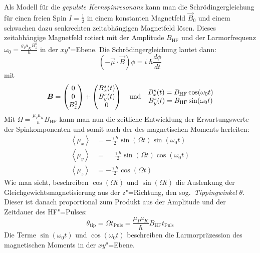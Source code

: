 Als Modell für die \emph{gepulste Kernspinresonanz} kann man die Schrödingergleichung für
einen freien Spin $I=\frac12$ in einem konstanten Magnetfeld $\vec B_0$ und einem schwachen dazu
senkrechten zeitabhängigen Magnetfeld lösen.
Dieses zeitabhängige Magnetfeld rotiert mit der Amplitude $B_\mathrm{HF}$ und der Larmorfrequenz
$\omega_0=\frac{g_I\mu_KB_z^0}{\hbar}$ in der $xy$"=Ebene. Die Schrödingergleichung lautet dann:
	\begin{equation}
		\left(-\vec\mu\cdot{\vec B}\right) \phi = i\;\hbar \frac{d\phi}{dt}
	\end{equation}
mit
	\[
			\bm B= \begin{pmatrix}0\\0\\B_z^0\end{pmatrix}+
					\begin{pmatrix}B_x^s(t)\\B_y^s(t)\\0\end{pmatrix}
	\quad\text{und}\quad
		\begin{matrix}
			B_x^s(t) = B_\mathrm{HF}\cos(\omega_0t)\\ 
			B_y^s(t) = B_\mathrm{HF}\sin(\omega_0t)
		\end{matrix}
	\]
Mit $\Omega=\frac{\mu_I\mu_K}{\hbar}B_\mathrm{HF}$ kann man nun die zeitliche Entwicklung der
Erwartungswerte der Spinkomponenten und somit auch der des magnetischen Moments herleiten:
	\begin{equation}
		\label{eqn:s_xyz}
		\begin{array}{rl}
			\left<\mu_x\right>&=-\frac{\gamma\;\hbar}2\sin(\Omega t)\sin(\omega_0t)\\
			\left<\mu_y\right>&=\phantom{-}\frac{\gamma\;\hbar}2\sin(\Omega t)\cos(\omega_0t)\\
			\left<\mu_z\right>&=-\frac{\gamma\;\hbar}2\cos(\Omega t)
		\end{array}
	\end{equation}
Wie man sieht, beschreiben $\cos(\Omega t)$ und $\sin(\Omega t)$ die Auslenkung der
Gleichgewichtsmagnetisierung aus der z"=Richtung, den sog.\ \emph{Tippingwinkel} $\theta$. Dieser ist
danach proportional zum Produkt aus der Amplitude und der Zeitdauer des HF"=Pulses:
	\begin{equation}
		\theta_\mathrm{tip} = \Omega t_\mathrm{Puls}
			= \frac{\mu_I\mu_K}{\hbar}B_\mathrm{HF}t_\mathrm{Puls}
	\end{equation}
Die Terme $\sin(\omega_0t)$ und $\cos(\omega_0t)$ beschreiben die Larmorpräzession des
magnetischen Moments in der $xy$"=Ebene.

